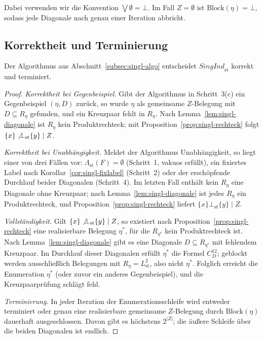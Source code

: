 Dabei verwenden wir die Konvention \(\bigvee\emptyset=\bot\). Im Fall
\(Z=\emptyset\) ist \(\mathrm{Block}(\eta)=\bot\), sodass jede Diagonale nach
genau einer Iteration abbricht.

\subsection{Korrektheit und Terminierung}
\label{subsec:singl-korrekt}

\begin{Lemma}
    \label{lem:singl-korrekt}
    Der Algorithmus aus Abschnitt~\ref{subsec:singl-algo} entscheidet
    \(\textit{SingInd}_{\mathrm{st}}\) korrekt und terminiert.
\end{Lemma}

\begin{proof}
    \label{pr:singl-korrekt}
    \emph{Korrektheit bei Gegenbeispiel.} Gibt der Algorithmus in
    Schritt~3(c) ein Gegenbeispiel \((\eta,D)\) zurück, so wurde \(\eta\) als
    gemeinsame \(Z\)-Belegung mit \(D\subseteq R_\eta\) gefunden, und ein
    Kreuzpaar fehlt in \(R_\eta\). Nach Lemma~\ref{lem:singl-diagonale} ist
    \(R_\eta\) kein Produktrechteck; mit Proposition~\ref{prop:singl-rechteck}
    folgt \(\{x\}\not\bot_{\mathrm{st}}\{y\}\mid Z\).

    \emph{Korrektheit bei Unabhängigkeit.} Meldet der Algorithmus
    Unabhängigkeit, so liegt einer von drei Fällen vor:
    \(\Lambda_{\mathrm{st}}(F)=\emptyset\) (Schritt~1, vakuos erfüllt), ein
    fixiertes Label nach Korollar~\ref{cor:singl-fixlabel} (Schritt~2) oder
    der erschöpfende Durchlauf beider Diagonalen (Schritt~4). Im letzten Fall
    enthält kein \(R_\eta\) eine Diagonale ohne Kreuzpaar; nach
    Lemma~\ref{lem:singl-diagonale} ist jedes \(R_\eta\) ein Produktrechteck,
    und Proposition~\ref{prop:singl-rechteck} liefert
    \(\{x\}\bot_{\mathrm{st}}\{y\}\mid Z\).

    \emph{Vollständigkeit.} Gilt \(\{x\}\not\bot_{\mathrm{st}}\{y\}\mid Z\), so
    existiert nach Proposition~\ref{prop:singl-rechteck} eine realisierbare
    Belegung \(\eta^\ast\), für die \(R_{\eta^\ast}\) kein Produktrechteck ist.
    Nach Lemma~\ref{lem:singl-diagonale} gibt es eine Diagonale
    \(D\subseteq R_{\eta^\ast}\) mit fehlendem Kreuzpaar. Im Durchlauf dieser
    Diagonalen erfüllt \(\eta^\ast\) die Formel \(C^{12}_{D}\); geblockt werden
    ausschließlich Belegungen mit \(R_\eta=L_{\mathrm{st}}^2\), also nicht
    \(\eta^\ast\). Folglich erreicht die Enumeration \(\eta^\ast\) (oder zuvor
    ein anderes Gegenbeispiel), und die Kreuzpaarprüfung schlägt fehl.

    \emph{Terminierung.} In jeder Iteration der Enumerationsschleife wird
    entweder terminiert oder genau eine realisierbare gemeinsame
    \(Z\)-Belegung durch \(\mathrm{Block}(\eta)\) dauerhaft ausgeschlossen.
    Davon gibt es höchstens \(2^{|Z|}\); die äußere Schleife über die beiden
    Diagonalen ist endlich.
\end{proof}

